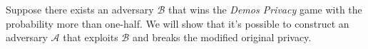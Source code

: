  
 Suppose there exists an adversary $\mathcal{B}$ that wins the \textit{Demos Privacy} game with the probability more than one-half. We will show that it's possible to construct an adversary $\mathcal{A}$ that exploits $\mathcal{B}$ and breaks the modified original privacy. \\
 
